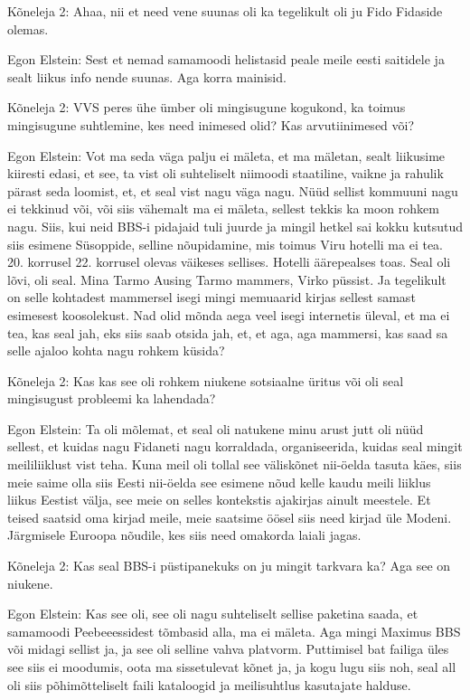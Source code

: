 Kõneleja 2:
Ahaa, nii et need vene suunas oli ka tegelikult oli ju Fido Fidaside olemas.
                 
Egon Elstein:
Sest et nemad samamoodi helistasid peale meile eesti saitidele ja sealt liikus info nende suunas. Aga korra mainisid.
                 
Kõneleja 2:
VVS peres ühe ümber oli mingisugune kogukond, ka toimus mingisugune suhtlemine, kes need inimesed olid? Kas arvutiinimesed või?
                 
Egon Elstein:
Vot ma seda väga palju ei mäleta, et ma mäletan, sealt liikusime kiiresti edasi, et see, ta vist oli suhteliselt niimoodi staatiline, vaikne ja rahulik pärast seda loomist, et, et seal vist nagu väga nagu.
Nüüd sellist kommuuni nagu ei tekkinud või, või siis vähemalt ma ei mäleta, sellest tekkis ka moon rohkem nagu.
Siis, kui neid BBS-i pidajaid tuli juurde ja mingil hetkel sai kokku kutsutud siis esimene Süsoppide, selline nõupidamine, mis toimus Viru hotelli ma ei tea. 20. korrusel 22. korrusel olevas väikeses sellises.
Hotelli äärepealses toas. Seal oli lõvi, oli seal.
Mina Tarmo Ausing Tarmo mammers, Virko püssist. Ja tegelikult on selle kohtadest mammersel isegi mingi memuaarid kirjas sellest samast esimesest koosolekust. Nad olid mõnda aega veel isegi internetis üleval, et ma ei tea, kas seal jah, eks siis saab otsida jah, et, et aga, aga mammersi, kas saad sa selle ajaloo kohta nagu rohkem küsida?
                 
Kõneleja 2:
Kas kas see oli rohkem niukene sotsiaalne üritus või oli seal mingisugust probleemi ka lahendada?
                 
Egon Elstein:
Ta oli mõlemat, et seal oli natukene minu arust jutt oli nüüd sellest, et kuidas nagu Fidaneti nagu korraldada, organiseerida, kuidas seal mingit meililiiklust vist teha. Kuna meil oli tollal see väliskõnet nii-öelda tasuta käes, siis meie saime olla siis Eesti nii-öelda see esimene nõud kelle kaudu meili liiklus liikus Eestist välja, see meie on selles kontekstis ajakirjas ainult meestele. Et teised saatsid oma kirjad meile, meie saatsime öösel siis need kirjad üle Modeni.
Järgmisele Euroopa nõudile, kes siis need omakorda laiali jagas.
                 
Kõneleja 2:
Kas seal BBS-i püstipanekuks on ju mingit tarkvara ka? Aga see on niukene.
                 
Egon Elstein:
Kas see oli, see oli nagu suhteliselt sellise paketina saada, et samamoodi Peebeeessidest tõmbasid alla, ma ei mäleta. Aga mingi Maximus BBS või midagi sellist ja, ja see oli selline vahva platvorm.
Puttimisel bat failiga üles see siis ei moodumis, oota ma sissetulevat kõnet ja, ja kogu lugu siis noh, seal all oli siis põhimõtteliselt faili kataloogid ja meilisuhtlus kasutajate halduse.
                 
